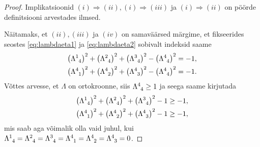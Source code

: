 \documentclass[12pt]{article}
\theoremstyle{plain}
\theoremstyle{definition}
\numberwithin{equation}{section}
\begin{document}
\begin{proof}
Implikatsioonid $(i) \Longrightarrow (ii), (i) \Longrightarrow (iii)$ 
ja $(i) \Longrightarrow (ii)$ on pöörde definitsiooni arvestades 
ilmsed.

Näitamaks, et $(ii), (iii)$ ja $(iv)$ on samaväärsed märgime, et 
fikseerides seostes \ref{eq:lambdaeta1} ja \ref{eq:lambdaeta2} 
sobivalt indeksid saame
\begin{align*}
\left(\Lambda\indices{^1_4}\right)^2 + 
	\left(\Lambda\indices{^2_4}\right)^2 + 
	\left(\Lambda\indices{^3_4}\right)^2 - 
	\left(\Lambda\indices{^4_4}\right)^2 = -1, \\
\left(\Lambda\indices{^4_1}\right)^2 + 
	\left(\Lambda\indices{^4_2}\right)^2 + 
	\left(\Lambda\indices{^4_3}\right)^2 - 
	\left(\Lambda\indices{^4_4}\right)^2 = -1.
\end{align*}
Võttes arvesse, et $\Lambda$ on ortokroonne, siis 
$\Lambda\indices{^4_4} \geq 1$ ja seega saame kirjutada
\begin{align*}
\left(\Lambda\indices{^1_4}\right)^2 + 
	\left(\Lambda\indices{^2_4}\right)^2 + 
	\left(\Lambda\indices{^3_4}\right)^2 - 1 \geq -1, \\
\left(\Lambda\indices{^4_1}\right)^2 + 
	\left(\Lambda\indices{^4_2}\right)^2 + 
	\left(\Lambda\indices{^4_3}\right)^2 - 1 \geq -1,
\end{align*}
mis saab aga võimalik olla vaid juhul, kui 
$\Lambda\indices{^1_4} = \Lambda\indices{^2_4} = 
\Lambda\indices{^3_4} = \Lambda\indices{^4_1} = 
\Lambda\indices{^4_2} = \Lambda\indices{^4_3} = 0$.


\end{proof}
\end{document}

